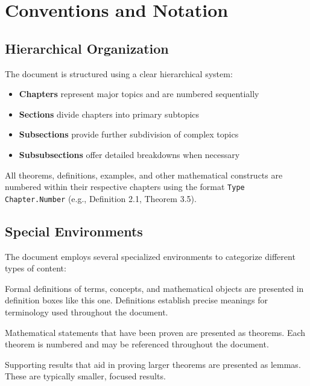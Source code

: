 \section*{Conventions and Notation}\label{sec:conventions-and-notation}

\subsection*{Hierarchical Organization}\label{subsec:hierarchical-organization}
The document is structured using a clear hierarchical system:
\begin{itemize}
    \item \textbf{Chapters} represent major topics and are numbered sequentially
    \item \textbf{Sections} divide chapters into primary subtopics
    \item \textbf{Subsections} provide further subdivision of complex topics
    \item \textbf{Subsubsections} offer detailed breakdowns when necessary
\end{itemize}

All theorems, definitions, examples, and other mathematical constructs are numbered within their respective chapters using the format \texttt{Type Chapter.Number} (e.g., Definition 2.1, Theorem 3.5).

\subsection*{Special Environments}\label{subsec:special-environments}

The document employs several specialized environments to categorize different types of content:

\begin{definition}
    Formal definitions of terms, concepts, and mathematical objects are presented in definition boxes like this one.
    Definitions establish precise meanings for terminology used throughout the document.
\end{definition}

\begin{theorem}
    Mathematical statements that have been proven are presented as theorems.
    Each theorem is numbered and may be referenced throughout the document.
\end{theorem}

\begin{lemma}
    Supporting results that aid in proving larger theorems are presented as lemmas.
    These are typically smaller, focused results.
\end{lemma}

